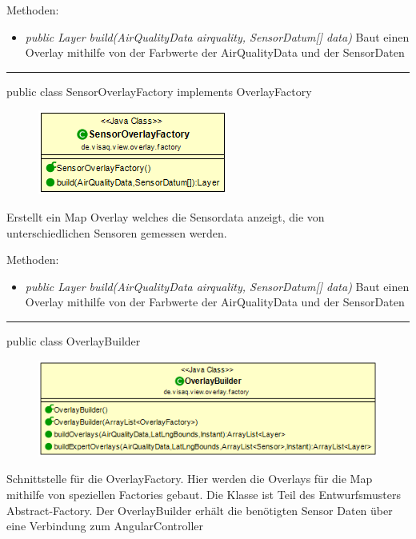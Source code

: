 Methoden:
\begin{itemize}
    \item \emph{public Layer build(AirQualityData airquality, SensorDatum[] data)}  Baut einen Overlay mithilfe von der Farbwerte der AirQualityData und der SensorDaten
\end{itemize}

\rule{\textwidth}{0.4pt}
public class SensorOverlayFactory implements OverlayFactory

\begin{minipage}{0.3\textwidth}
    \begin{figure}[H]
        \includegraphics[scale = 0.5]{media/frontend/view/de.view.overlay.factory/SensorOverlayFactory_Class.png}
    \end{figure}
    \end{minipage} \hfill
    \begin{minipage}{0.6\textwidth}
        Erstellt ein Map Overlay welches die Sensordata anzeigt, die von unterschiedlichen Sensoren gemessen werden.
\end{minipage}

Methoden:
\begin{itemize}
    \item \emph{public Layer build(AirQualityData airquality, SensorDatum[] data)}  Baut einen Overlay mithilfe von der Farbwerte der AirQualityData und der SensorDaten
\end{itemize}

\rule{\textwidth}{0.4pt}
public class OverlayBuilder

\begin{minipage}{0.6\textwidth}
    \begin{figure}[H]
        \includegraphics[scale = 0.5]{media/frontend/view/de.view.overlay.factory/OverlayBuilder_Class.png}
    \end{figure}
    \end{minipage} \hfill
    \begin{minipage}{0.4\textwidth}
Schnittstelle für die OverlayFactory. Hier werden die Overlays für die Map mithilfe von speziellen Factories gebaut. Die Klasse ist Teil des Entwurfsmusters Abstract-Factory. Der OverlayBuilder erhält die benötigten Sensor Daten über eine Verbindung zum AngularController
\end{minipage}

